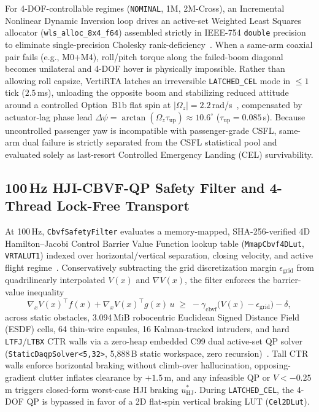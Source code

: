 \documentclass[conference,10pt]{IEEEtran}
\begin{document}
For 4-DOF-controllable regimes (\texttt{NOMINAL}, 1M, 2M-Cross), an Incremental Nonlinear Dynamic Inversion loop drives an active-set Weighted Least Squares allocator (\texttt{wls\_alloc\_8x4\_f64}) assembled strictly in IEEE-754 \texttt{double} precision to eliminate single-precision Cholesky rank-deficiency~\cite{smeur_indi_wls_2020}. When a same-arm coaxial pair fails (e.g., M0+M4), roll/pitch torque along the failed-boom diagonal becomes unilateral and 4-DOF hover is physically impossible. Rather than allowing roll capsize, VertiRTA latches an irreversible \texttt{LATCHED\_CEL} mode in $\le 1$ tick ($2.5$\,ms), unloading the opposite boom and stabilizing reduced attitude around a controlled Option~B1b flat spin at $|\Omega_z|=2.2$\,rad/s~\cite{mueller_relaxed_hover_2014}, compensated by actuator-lag phase lead $\Delta\psi=\arctan(\Omega_z\tau_{\text{up}})\approx 10.6^\circ$ ($\tau_{\text{up}}=0.085$\,s). Because uncontrolled passenger yaw is incompatible with passenger-grade CSFL, same-arm dual failure is strictly separated from the CSFL statistical pool and evaluated solely as last-resort Controlled Emergency Landing (CEL) survivability.

\subsection{100\,Hz HJI-CBVF-QP Safety Filter and 4-Thread Lock-Free Transport}

At 100\,Hz, \texttt{CbvfSafetyFilter} evaluates a memory-mapped, SHA-256-verified 4D Hamilton--Jacobi Control Barrier Value Function lookup table (\texttt{MmapCbvf4DLut}, \texttt{VRTALUT1}) indexed over horizontal/vertical separation, closing velocity, and active flight regime~\cite{choi_cbvf_2021}. Conservatively subtracting the grid discretization margin $\epsilon_{\text{grid}}$ from quadrilinearly interpolated $V(x)$ and $\nabla V(x)$, the filter enforces the barrier-value inequality
\begin{equation}
  \nabla_x V(x)^\top f(x) + \nabla_x V(x)^\top g(x)\,u \;\ge\; -\gamma_{\text{cbvf}}\bigl(V(x)-\epsilon_{\text{grid}}\bigr) - \delta,
  \label{eq:cbvf_qp}
\end{equation}
across static obstacles, 3.094\,MiB robocentric Euclidean Signed Distance Field (ESDF) cells, 64 thin-wire capsules, 16 Kalman-tracked intruders, and hard \texttt{LTFJ}/\texttt{LTBX} CTR walls via a zero-heap embedded C99 dual active-set QP solver (\texttt{StaticDaqpSolver<5,32>}, 5{,}888\,B static workspace, zero recursion)~\cite{arnstrom_daqp_2022}. Tall CTR walls enforce horizontal braking without climb-over hallucination, opposing-gradient clutter inflates clearance by $+1.5$\,m, and any infeasible QP or $V<-0.25$\,m triggers closed-form worst-case HJI braking $u^*_{\text{HJ}}$. During \texttt{LATCHED\_CEL}, the 4-DOF QP is bypassed in favor of a 2D flat-spin vertical braking LUT (\texttt{Cel2DLut}).
\end{document}
